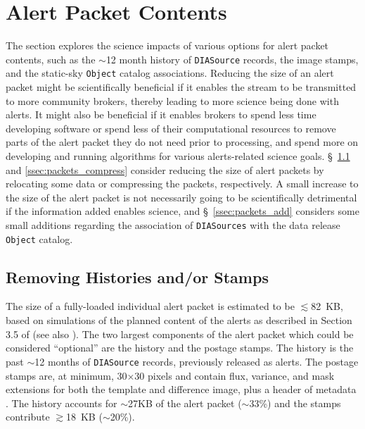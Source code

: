 \documentclass[DM,lsstdraft,authoryear,toc]{lsstdoc}
\begin{document}
\clearpage
\section{Alert Packet Contents} \label{sec:packets}

The section explores the science impacts of various options for alert packet contents, such as the $\sim$12 month history of {\tt DIASource} records, the image stamps, and the static-sky {\tt Object} catalog associations.
Reducing the size of an alert packet might be scientifically beneficial if it enables the stream to be transmitted to more community brokers, thereby leading to more science being done with alerts.
It might also be beneficial if it enables brokers to spend less time developing software or spend less of their computational resources to remove parts of the alert packet they do not need prior to processing, and spend more on developing and running algorithms for various alerts-related science goals.
\S~\ref{ssec:packets_remove} and \ref{ssec:packets_compress} consider reducing the size of alert packets by relocating some data or compressing the packets, respectively. 
A small increase to the size of the alert packet is not necessarily going to be scientifically detrimental if the information added enables science, and \S~\ref{ssec:packets_add} considers some small additions regarding the association of {\tt DIASources} with the data release {\tt Object} catalog.

\subsection{Removing Histories and/or Stamps}\label{ssec:packets_remove}

The size of a fully-loaded individual alert packet is estimated to be $\lesssim$82~KB, based on simulations of the planned content of the alerts as described in Section 3.5 of  (see also ). The two largest components of the alert packet which could be considered ``optional'' are the history and the postage stamps. The history is the past $\sim$12 months of {\tt DIASource} records, previously released as alerts. The postage stamps are, at minimum, 30$\times$30 pixels and contain flux, variance, and mask extensions for both the template and difference image, plus a header of metadata . The history accounts for $\sim$27KB of the alert packet ($\sim$33\%) and the stamps contribute $\gtrsim$18~KB ($\sim$20\%). 
\end{document}
